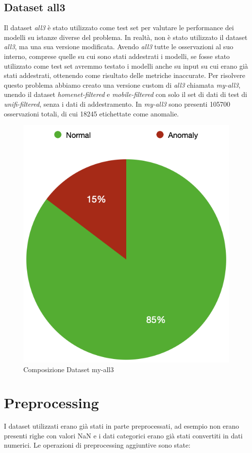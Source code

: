 \subsection{Dataset all3}
Il dataset \textit{all3} \`e stato utilizzato come test set per valutare le performance dei modelli su istanze diverse del problema. In realt\`a, non \`e stato utilizzato il dataset \textit{all3}, ma una sua versione modificata. Avendo \textit{all3} tutte le osservazioni al suo interno, comprese quelle su cui sono stati addestrati i modelli, se fosse stato utilizzato come test set avremmo testato i modelli anche su input su cui erano gi\`a stati addestrati, ottenendo come risultato delle metriche inaccurate. Per risolvere questo problema abbiamo creato una versione custom di \textit{all3} chiamata \textit{my-all3}, unendo il dataset \textit{homenet-filtered} e \textit{mobile-filtered} con solo il set di dati di test di \textit{unifi-filtered}, senza i dati di addestramento.
In \textit{my-all3} sono presenti 105700 osservazioni totali, di cui 18245 etichettate come anomalie.

\begin{figure}[H]
    \centering
    \includegraphics[width=0.5\linewidth]{balance_myall3.png}
    \caption{Composizione Dataset my-all3}
    \label{fig:enter-label}
\end{figure}



\section{Preprocessing}
I dataset utilizzati erano gi\`a stati in parte preprocessati, ad esempio non erano presenti righe con valori NaN e i dati categorici erano gi\`a stati convertiti in dati numerici.
Le operazioni di preprocessing aggiuntive sono state:


